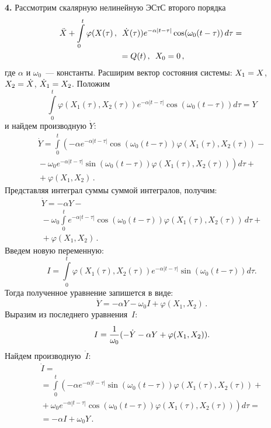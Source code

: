 \begin{multicols}{2}
{\bf 4.}
 Рассмотрим скалярную нелинейную ЭСтС второго порядка
    \begin{multline*}
    \ddot{X}+\int\limits_{0}^{t}\varphi(X(\tau)\,,\enskip 
    \dot{X}(\tau))e^{-\alpha |t-\tau|} \cos (\omega_0(t-\tau))\,d\tau ={}\\
    {}= Q(t)\,,\enskip  X_0 = 0\,,
    \end{multline*}
где $\alpha$ и $\omega_0$~--- константы. Расширим вектор состояния системы:
$X_1 \hm= X$, $X_2 \hm= \dot{X}$, $\dot{X}_1 \hm= X_2$.
Положим
    $$
    \int\limits_{0}^{t}\varphi(X_1(\tau),X_2(\tau))e^{-\alpha |t-\tau|}
    \cos\left(\omega_0(t-\tau)\right)d\tau = Y
    $$
и найдем производную $\dot{Y}$:
    \begin{multline*}
\!   \!\!\! \dot{Y} =  \int\limits_{0}^{t}\!\!
    \left(-\alpha e^{-\alpha |t-\tau|} \cos(\omega_0(t-\tau)) \varphi(X_1(\tau),X_2(\tau))
    \right. -{}\\
{}-\left.\omega_0 e^{-\alpha |t-\tau|} \sin(\omega_0(t-\tau)) \varphi(X_1(\tau),X_2(\tau))
    \right)d\tau +{}\\
    {}+ \varphi(X_1,X_2)\,.
    \end{multline*}
Представляя интеграл суммы суммой интегралов, получим:
\begin{multline*}
 \dot{Y} =  -\alpha Y-{}\\
 {}- \omega_0 \int\limits_{0}^{t}
     e^{-\alpha |t-\tau|} \cos(\omega_0(t-\tau)) \varphi(X_1(\tau),X_2(\tau))
    \,d\tau + {}\\
    {}+\varphi(X_1,X_2)\,.
\end{multline*}
Введем новую переменную:
    $$
    I = \int\limits_{0}^{t}\varphi(X_1(\tau),X_2(\tau))e^{-\alpha |t-\tau|}
    \sin\left(\omega_0(t-\tau)\right)d\tau.$$
Тогда полученное уравнение запишется в виде:
    $$
    \dot{Y} =  -\alpha Y- \omega_0 I + \varphi(X_1,X_2)\,.
    $$
Выразим из последнего уравнения~$I$:
    $$I = \displaystyle\frac{\displaystyle 1\mathstrut}{\displaystyle \omega_0\mathstrut} (-\dot{Y}-\alpha Y + \varphi (X_1, X_2)).$$
Найдем производную~$\dot{I}$:
    \begin{multline*}
    \dot{I} = {}\\
    {}= \int\limits_{0}^{t}
    \left(-\alpha e^{-\alpha |t-\tau|} \sin(\omega_0(t-\tau)) \varphi(X_1(\tau),X_2(\tau))\right. +{}\\
    {}+\left.\omega_0 e^{-\alpha |t-\tau|} \cos(\omega_0(t-\tau)) 
    \varphi(X_1(\tau),X_2(\tau))
    \right)d\tau={}\\
    {}=-\alpha I + \omega_0 Y\,.
    \end{multline*}


\end{multicols}
